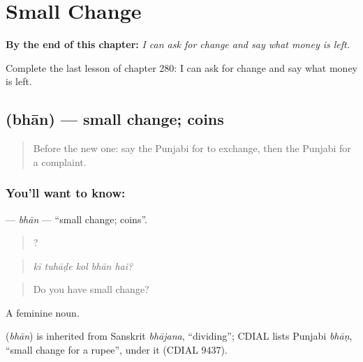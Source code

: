 
\chapter{Small Change}
\label{ch:pa-a2-small-change}

\begin{chapteropening}
\textbf{By the end of this chapter:} \emph{I can ask for change and say what money is left.}

Complete the last lesson of chapter 280: I can ask for change and say what money is left.
\end{chapteropening}

\section[\texorpdfstring{\pa{ਭਾਨ} (bhān)}{ਭਾਨ (bhān)}]{ (bhān) — small change; coins}

\label{lesson:PA-C280-bhan}



\begin{quote}
Before the new one: say the Punjabi for to exchange, then the Punjabi for a complaint.
\end{quote}

\subsection*{You'll want to know: }
\textbf{} — \emph{bhān} — \textquotedblleft{}small change; coins\textquotedblright{}.

\begin{quote}
    ?
\end{quote}

\begin{quote}
\emph{kī tuhāḍe kol bhān hai?}
\end{quote}

\begin{quote}
Do you have small change?
\end{quote}

A feminine noun.

\begin{cousinweb}
\textbf{} (\emph{bhān}) is inherited from Sanskrit \emph{bhājana}, \textquotedblleft{}dividing\textquotedblright{}; CDIAL lists Punjabi \emph{bhāṇ}, \textquotedblleft{}small change for a rupee\textquotedblright{}, under it (CDIAL 9437).
\end{cousinweb}

